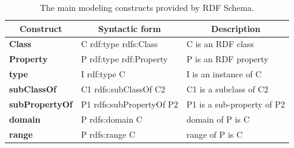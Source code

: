 \begin{table}[!ht]
    \centering
    \doublespacing
    \begin{tabular}{|l|l|l|}
        \hline
        \multicolumn{1}{|c|}{\textbf{Construct}} & \multicolumn{1}{c|}{\textbf{Syntactic form}} & \multicolumn{1}{c|}{\textbf{Description}}            \\ \hline
        \textbf{Class}                           & C rdf:type rdfs:Class                        & C is an RDF class                       \\ \hline
        \textbf{Property}                        & P rdf:type rdf:Property                      & P is an RDF property                    \\ \hline
        \textbf{type}                            & I rdf:type C                                 & I is an instance of C         \\ \hline
        \textbf{subClassOf}                      & C1 rdfs:subClassOf C2                        & C1 is a subclass of C2           \\ \hline
        \textbf{subPropertyOf}                   & P1 rdfs:subPropertyOf P2                     & P1 is a sub-property of P2 \\ \hline
        \textbf{domain}                          & P rdfs:domain C                              & domain of P is C             \\ \hline
        \textbf{range}                           & P rdfs:range C                               & range of P is C              \\ \hline
    \end{tabular}
    \caption{The main modeling constructs provided by RDF Schema.}
    \label{tab:rdfs-constructs}
\end{table}

